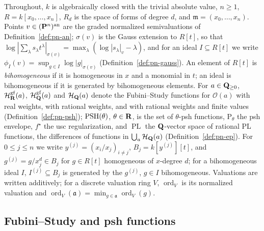 \begin{convention}\label{conv:bj-pn}
Throughout, $k$ is algebraically closed with the trivial absolute value, $n\ge1$,
$R=k[x_0,\dots,x_n]$, $R_d$ is the space of forms of degree $d$, and $\mathfrak m=(x_0,\dots,x_n)$.
Points $v\in(\mathbf{P}^n)^{\mathrm{an}}$ are the graded normalized semivaluations of Definition~\ref{def:pn-an};
$\sigma(v)$ is the Gauss extension to $R[t]$, so that $\log|\sum_\lambda s_\lambda t^\lambda|_{\sigma(v)}
=\max_\lambda(\log|s_\lambda|_v-\lambda)$, and for an ideal $I\subseteq R[t]$ we write
$\phi_I(v)=\sup_{g\in I}\log|g|_{\sigma(v)}$ (Definition~\ref{def:pn-gauss}). An element of $R[t]$ is
\emph{bihomogeneous} if it is homogeneous in $x$ and a monomial in $t$; an ideal is bihomogeneous if
it is generated by bihomogeneous elements. For $a\in\mathbf{Q}_{\ge0}$, $\mathcal H^{\mathrm{gf}}_{\mathbf{R}}(a)$,
$\mathcal H^{\mathrm{gf}}_{\mathbf{Q}}(a)$ and $\mathcal H_{\mathbf{Q}}(a)$ denote the Fubini--Study functions for
$\mathcal O(a)$ with real weights, with rational weights, and with rational weights and finite values
(Definition~\ref{def:pn-psh}); $\operatorname{PSH}(\theta)$, $\theta\in\mathbf{R}$, is the set of $\theta$-psh functions,
$\mathrm P_\theta$ the psh envelope, $f^\star$ the usc regularization, and $\operatorname{PL}$ the
$\mathbf{Q}$-vector space of rational PL functions, the differences of functions in $\bigcup_a\mathcal H_{\mathbf{Q}}(a)$
(Definition~\ref{def:pn-ep}). For $0\le j\le n$ we write $y^{(j)}=(x_i/x_j)_{i\ne j}$,
$B_j=k[y^{(j)}][t]$, and $g^{(j)}=g/x_j^{d}\in B_j$ for $g\in R[t]$ homogeneous of $x$-degree $d$; for
a bihomogeneous ideal $I$, $I^{(j)}\subseteq B_j$ is generated by the $g^{(j)}$, $g\in I$ bihomogeneous.
Valuations are written additively; for a discrete valuation ring $V$, $\operatorname{ord}_V$ is its normalized
valuation and $\operatorname{ord}_V(\mathfrak a)=\min_{g\in\mathfrak a}\operatorname{ord}_V(g)$.
\end{convention}

\subsection{Fubini--Study and psh functions}

